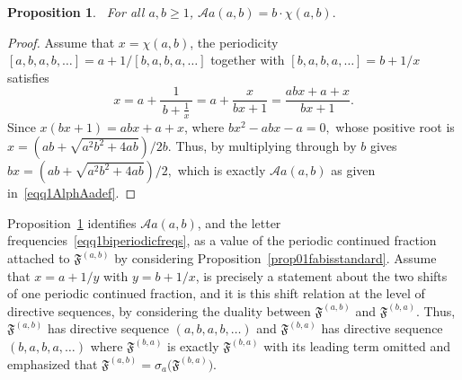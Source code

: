 \documentclass[12pt]{amsart}
\theoremstyle{plain}
\newtheorem{proposition}[theorem]{Proposition}
\theoremstyle{definition}
\theoremstyle{remark}
\newcommand{\AlphA}{\mathcal{A}}
\newcommand{\FD}{\mathfrak{F}}
\begin{document}
\begin{proposition}~\label{prop01AlphAacf}
For all $a,b\geqslant 1$, $\AlphA a(a,b) = b\cdot\chi(a,b).$
\end{proposition}
\begin{proof}
Assume that $x=\chi(a,b)$, the periodicity $[a,b,a,b,\ldots] =
a+1/[b,a,b,a,\ldots]$ together with $[b,a,b,a,\ldots] = b+1/x$ satisfies
\[
  x = a+\frac{1}{\,b+\frac1x\,} = a + \frac{x}{bx+1} = \frac{abx+a+x}{bx+1}.
\]
Since $x(bx+1) = abx+a+x$, where $bx^2-abx-a=0,$
whose positive root is $x = (ab+\sqrt{a^2b^2+4ab})/2b.$ Thus, by multiplying through by $b$ gives $bx =(ab+\sqrt{a^2b^2+4ab})/2,$ 
which is exactly $\AlphA a(a,b)$ as given in~\eqref{eqq1AlphAadef}.
\end{proof}


Proposition~\ref{prop01AlphAacf} identifies $\AlphA a(a,b)$, and the
letter frequencies~\eqref{eqq1biperiodicfreqs}, as a value of the
periodic continued fraction attached to $\FD^{(a,b)}$ by considering
Proposition~\ref{prop01fabisstandard}. 
Assume that $x=a+1/y$ with $y=b+1/x$, is precisely a statement about the
two shifts of one periodic continued fraction, and it is this
shift relation  at the level of directive sequences, by considering the
duality between $\FD^{(a,b)}$ and $\FD^{(b,a)}$. Thus, $\FD^{(a,b)}$ has directive
sequence $(a,b,a,b,\ldots)$ and $\FD^{(b,a)}$ has directive sequence
$(b,a,b,a,\ldots)$ where $\FD^{(b,a)}$ is exactly $\FD^{(b,a)}$ with its leading
term omitted and emphasized that $\FD^{(a,b)} = \sigma_a\bigl(\FD^{(b,a)}\bigr)$. 
\end{document}
